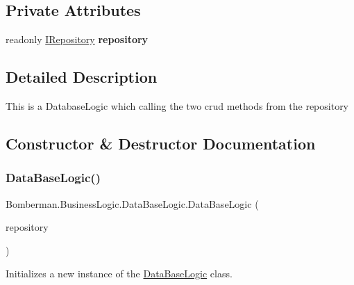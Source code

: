 \subsection*{Private Attributes}
\begin{DoxyCompactItemize}
\item 
\mbox{\label{class_bomberman_1_1_business_logic_1_1_data_base_logic_a2c0983563a67a52e1e419d6da939e5a6}} 
readonly \mbox{\hyperlink{interface_bomberman_1_1_repository_1_1_i_repository}{I\+Repository}} {\bfseries repository}
\end{DoxyCompactItemize}


\subsection{Detailed Description}
This is a Database\+Logic which calling the two crud methods from the repository 



\subsection{Constructor \& Destructor Documentation}
\mbox{\label{class_bomberman_1_1_business_logic_1_1_data_base_logic_a5e835cdb14e199501fee1aa6c642873e}} 
\subsubsection{\texorpdfstring{DataBaseLogic()}{DataBaseLogic()}}
{\footnotesize\ttfamily Bomberman.\+Business\+Logic.\+Data\+Base\+Logic.\+Data\+Base\+Logic (\begin{DoxyParamCaption}\item[{\mbox{\hyperlink{interface_bomberman_1_1_repository_1_1_i_repository}{I\+Repository}}}]{repository }\end{DoxyParamCaption})\hspace{0.3cm}{\ttfamily [inline]}}



Initializes a new instance of the \mbox{\hyperlink{class_bomberman_1_1_business_logic_1_1_data_base_logic}{Data\+Base\+Logic}} class. 


